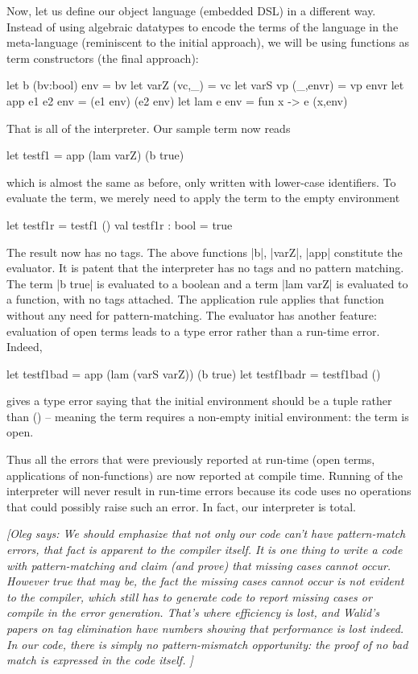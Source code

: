 \documentclass[preprint]{sigplanconf}
\newcommand{\oleg}[1]{{\it [Oleg says: #1]}}
\begin{document}
Now, let us define our object language (embedded DSL) in a different
way. Instead of using algebraic datatypes to encode the terms of the
language in the meta-language (reminiscent to the initial approach),
we will be using functions as term constructors (the final approach):

\begin{code}
  let b (bv:bool) env = bv
  let varZ (vc,_) = vc
  let varS vp (_,envr) = vp envr
  let app e1 e2 env = (e1 env) (e2 env)
  let lam e env = fun x -> e (x,env)
\end{code}

That is all of the interpreter. Our sample term now reads
\begin{code}
  let testf1 = app (lam varZ) (b true)
\end{code}
which is almost the same as before, only written with lower-case
identifiers. To evaluate the term, we merely need to apply 
the term to the empty environment

\begin{code}
  let testf1r = testf1 ()
  val testf1r : bool = true
\end{code}

The result now has no tags. The above functions |b|,
|varZ|, |app| constitute the evaluator. It is patent that the
interpreter has no tags and no pattern matching. The term |b true| is
evaluated to a boolean and a term |lam varZ| is evaluated to a
function, with no tags attached. The application rule applies that
function without any need for pattern-matching. The evaluator has
another feature: evaluation of open terms leads to a type error rather
than a run-time error. Indeed, 

\begin{code}
  let testf1bad = app (lam (varS varZ)) (b true)
  let testf1badr = testf1bad ()
\end{code}
gives a type error saying 
that the initial environment should be a tuple rather than () --
meaning the term requires a non-empty initial environment: the term is
open.

Thus all the errors that were previously reported at run-time (open terms,
applications of non-functions) are now reported at compile
time. Running of the interpreter will never result in run-time errors
because its code uses no operations that could possibly raise such
an error. In fact, our interpreter is total.


\oleg{
We should emphasize that not only our code can't have pattern-match
errors, that fact is apparent to the compiler itself. It is one thing
to write a code with pattern-matching and claim (and prove) that
missing cases cannot occur. However true that may be, the fact the
missing cases cannot occur is not evident to the compiler, which still
has to generate code to report missing cases or compile in the error
generation. That's where efficiency is lost, and Walid's papers on tag
elimination have numbers showing that performance is lost indeed. 
In our code, there is simply no pattern-mismatch opportunity: the
proof of no bad match is expressed in the code itself. }
\end{document}
